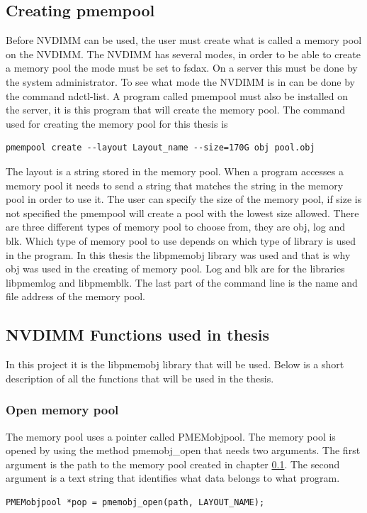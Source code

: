 \documentclass[12pt,a4paper,USenglish]{article}      %
\begin{document}
\subsection{Creating pmempool}
\label{section:memorypool}
Before NVDIMM can be used, the user must create what is called a memory pool on the NVDIMM. The NVDIMM has several modes, in order to be able to create a memory pool the mode must be set to fsdax. On a server this must be done by the system administrator. To see what mode the NVDIMM is in can be done by the command ndctl-list. A program called pmempool must also be installed on the server, it is this program that will create the memory pool.
The command used for creating the memory pool for this thesis is 
\begin{lstlisting}
pmempool create --layout Layout_name --size=170G obj pool.obj
\end{lstlisting}
The layout is a string stored in the memory pool. When a program accesses a memory pool it needs to send a string that matches the string in the memory pool in order to use it. The user can specify the size of the memory pool, if size is not specified the pmempool will create a pool with the lowest size allowed.
There are three different types of memory pool to choose from, they are obj, log and blk. Which type of memory pool to use depends on which type of library is used in the program. In this thesis the libpmemobj library was used and that is why obj was used in the creating of memory pool. Log and blk are for the libraries libpmemlog and libpmemblk.
The last part of the command line is the name and file address of the memory pool.

\subsection{NVDIMM Functions used in thesis}
In this project it is the libpmemobj library that will be used. Below is a short description of all the functions that will be used in the thesis. 
\subsubsection{Open memory pool}
\label{subsection:openmemorypool}
The memory pool uses a pointer called PMEMobjpool. The memory pool is opened by using the method pmemobj\_open that needs two arguments. The first argument is the path to the memory pool created in chapter \ref{section:memorypool}. The second argument is a text string that identifies what data belongs to what program.
\begin{lstlisting}
PMEMobjpool *pop = pmemobj_open(path, LAYOUT_NAME);
\end{lstlisting}
\end{document}
